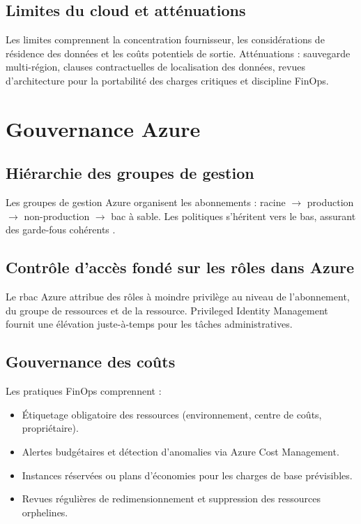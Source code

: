 \subsection{Limites du cloud et atténuations}

Les limites comprennent la concentration fournisseur, les considérations de résidence des données et les coûts potentiels de sortie. Atténuations : sauvegarde multi-région, clauses contractuelles de localisation des données, revues d'architecture pour la portabilité des charges critiques et discipline FinOps.

\section{Gouvernance Azure}

\subsection{Hiérarchie des groupes de gestion}

Les groupes de gestion Azure organisent les abonnements : racine $\rightarrow$ production $\rightarrow$ non-production $\rightarrow$ bac à sable. Les politiques s'héritent vers le bas, assurant des garde-fous cohérents \parencite{microsoftCloudAdoption}.

\subsection{Contrôle d'accès fondé sur les rôles dans Azure}

Le \gls{rbac} Azure attribue des rôles à moindre privilège au niveau de l'abonnement, du groupe de ressources et de la ressource. Privileged Identity Management fournit une élévation juste-à-temps pour les tâches administratives.

\subsection{Gouvernance des coûts}

Les pratiques FinOps \parencite{finopsfoundation} comprennent :
\begin{itemize}
  \item Étiquetage obligatoire des ressources (environnement, centre de coûts, propriétaire).
  \item Alertes budgétaires et détection d'anomalies via Azure Cost Management.
  \item Instances réservées ou plans d'économies pour les charges de base prévisibles.
  \item Revues régulières de redimensionnement et suppression des ressources orphelines.
\end{itemize}

